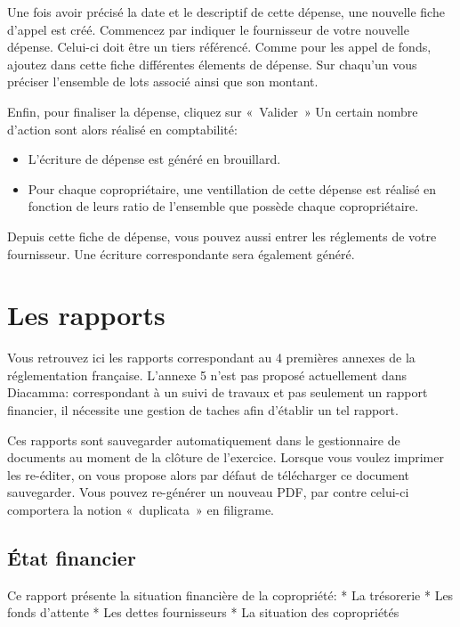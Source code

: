 \documentclass[a4paper,10pt,oneside,french]{sphinxmanual}
\begin{document}
Une fois avoir précisé la date et le descriptif de cette dépense, une nouvelle fiche d’appel est créé.
Commencez par indiquer le fournisseur de votre nouvelle dépense. Celui-ci doit être un tiers référencé.
Comme pour les appel de fonds, ajoutez dans cette fiche différentes élements de dépense. Sur chaqu’un vous préciser l’ensemble de lots associé ainsi que son montant.
\begin{quote}

\noindent{}
\end{quote}

Enfin, pour finaliser la dépense, cliquez sur « Valider »
Un certain nombre d’action sont alors réalisé en comptabilité:
\begin{itemize}
\item {} 
L’écriture de dépense est généré en brouillard.

\item {} 
Pour chaque copropriétaire, une ventillation de cette dépense est réalisé en fonction de leurs ratio de l’ensemble que possède chaque copropriétaire.

\end{itemize}

Depuis cette fiche de dépense, vous pouvez aussi entrer les réglements de votre fournisseur.
Une écriture correspondante sera également généré.


\section{Les rapports}
\label{\detokenize{condominium/report:les-rapports}}\label{\detokenize{condominium/report::doc}}
Vous retrouvez ici les rapports correspondant au 4 premières annexes de la réglementation française.
L’annexe 5 n’est pas proposé actuellement dans Diacamma: correspondant à un suivi de travaux et pas seulement un rapport financier, il nécessite une gestion de taches afin d’établir un tel rapport.

Ces rapports sont sauvegarder automatiquement dans le gestionnaire de documents au moment de la clôture de l’exercice.
Lorsque vous voulez imprimer les re-éditer, on vous propose alors par défaut de télécharger ce document sauvegarder.
Vous pouvez re-générer un nouveau PDF, par contre celui-ci comportera la notion « duplicata » en filigrame.


\subsection{État financier}
\label{\detokenize{condominium/report:etat-financier}}
Ce rapport présente la situation financière de la copropriété:
* La trésorerie
* Les fonds d’attente
* Les dettes fournisseurs
* La situation des copropriétés
\end{document}
